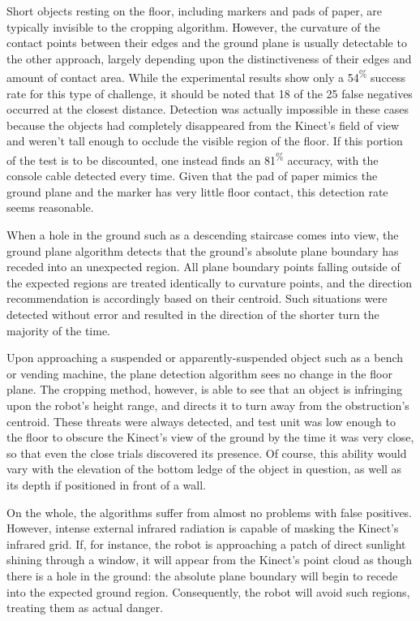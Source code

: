 \documentclass[12pt]{report}
\begin{document}
Short objects resting on the floor, including markers and pads of paper, are typically invisible to the cropping algorithm.  However, the curvature of the contact points between their edges and the ground plane is usually detectable to the other approach, largely depending upon the distinctiveness of their edges and amount of contact area.  While the experimental results show only a 54\textsuperscript{\%} success rate for this type of challenge, it should be noted that 18 of the 25 false negatives occurred at the closest distance.  Detection was actually impossible in these cases because the objects had completely disappeared from the Kinect's field of view and weren't tall enough to occlude the visible region of the floor.  If this portion of the test is to be discounted, one instead finds an 81\textsuperscript{\%} accuracy, with the console cable detected every time.  Given that the pad of paper mimics the ground plane and the marker has very little floor contact, this detection rate seems reasonable.

When a hole in the ground such as a descending staircase comes into view, the ground plane algorithm detects that the ground's absolute plane boundary has receded into an unexpected region.  All plane boundary points falling outside of the expected regions are treated identically to curvature points, and the direction recommendation is accordingly based on their centroid.  Such situations were detected without error and resulted in the direction of the shorter turn the majority of the time.

Upon approaching a suspended or apparently-suspended object such as a bench or vending machine, the plane detection algorithm sees no change in the floor plane.  The cropping method, however, is able to see that an object is infringing upon the robot's height range, and directs it to turn away from the obstruction's centroid.  These threats were always detected, and test unit was low enough to the floor to obscure the Kinect's view of the ground by the time it was very close, so that even the close trials discovered its presence.  Of course, this ability would vary with the elevation of the bottom ledge of the object in question, as well as its depth if positioned in front of a wall.

On the whole, the algorithms suffer from almost no problems with false positives.  However, intense external infrared radiation is capable of masking the Kinect's infrared grid.  If, for instance, the robot is approaching a patch of direct sunlight shining through a window, it will appear from the Kinect's point cloud as though there is a hole in the ground: the absolute plane boundary will begin to recede into the expected ground region.  Consequently, the robot will avoid such regions, treating them as actual danger.
\end{document}
